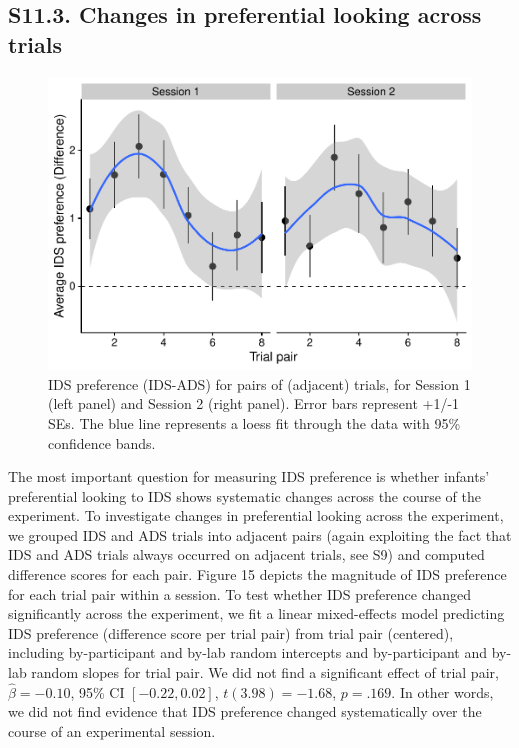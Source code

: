 \documentclass[
  man, donotrepeattitle,floatsintext]{apa6}
\begin{document}
\hypertarget{s11.3.-changes-in-preferential-looking-across-trials}{%
\subsection{S11.3. Changes in preferential looking across trials}\label{s11.3.-changes-in-preferential-looking-across-trials}}

\begin{figure}

{\centering \includegraphics{MB1T_supplement_files/figure-latex/fig15-1} 

}

\caption{IDS preference (IDS-ADS) for pairs of (adjacent) trials, for Session 1 (left panel) and Session 2 (right panel). Error bars represent +1/-1 SEs. The blue line represents a loess fit through the data with 95\% confidence bands.}\label{fig:fig15}
\end{figure}

The most important question for measuring IDS preference is whether infants' preferential looking to IDS shows systematic changes across the course of the experiment.
To investigate changes in preferential looking across the experiment, we grouped IDS and ADS trials into adjacent pairs (again exploiting the fact that IDS and ADS trials always occurred on adjacent trials, see S9) and computed difference scores for each pair.
Figure 15 depicts the magnitude of IDS preference for each trial pair within a session.
To test whether IDS preference changed significantly across the experiment, we fit a linear mixed-effects model predicting IDS preference (difference score per trial pair) from trial pair (centered), including by-participant and by-lab random intercepts and by-participant and by-lab random slopes for trial pair.
We did not find a significant effect of trial pair, \(\hat{\beta} = -0.10\), 95\% CI \([-0.22, 0.02]\), \(t(3.98) = -1.68\), \(p = .169\).
In other words, we did not find evidence that IDS preference changed systematically over the course of an experimental session.
\end{document}

